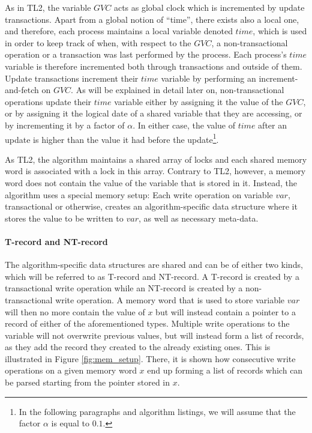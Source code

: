 \documentclass[11pt,letterpaper]{article}
\begin{document}
As in TL2,  the variable $\mathit{GVC}$
acts as  global  clock  which  is incremented  by update transactions.
 Apart from a global   notion of ``time'', there exists also
a local one, and therefore, each process maintains a local  
variable denoted $\mathit{time}$,  which is used in order to keep  
track of when, with
respect to the $\mathit{GVC}$, a non-transactional operation 
or a transaction was last performed by
the  process. Each  process's  $\mathit{time}$   variable is   
therefore incremented
both through transactions and outside  
of  them. Update  transactions  increment their  $\mathit{time}$ variable  by
performing an increment-and-fetch  
on  $\mathit{GVC}$.  As  will  be explained  in  detail  later  on,
non-transactional operations update  
their $\mathit{time}$ variable either by  assigning it the value of 
the $\mathit{GVC}$, or by assigning it the  
logical date of a shared variable that they are accessing, or by incrementing
it by a factor of $\alpha$.  
In either  case, the value of $\mathit{time}$ after an update  is higher than
the value  it had before  the update\footnote{In the   following paragraphs
and algorithm listings, we will assume that the factor $\alpha$ is equal   
to $0.1$.}.

As TL2, the  algorithm maintains a  shared array of locks  and each
shared memory word  
is associated with a lock in this array. Contrary to TL2, however, a memory
word does not contain  
the value of the variable that  is stored in it. Instead, the algorithm uses
a  special memory setup:  
Each   write  operation  on   variable  $\mathit{var}$,   transactional  or
otherwise, creates an algorithm-specific data  
structure where  it stores  the value to  be written to  $\mathit{var}$, as
well as necessary meta-data.


\paragraph{T-record  and NT-record}
The  algorithm-specific  data structures  are shared  and  can be  of 
either  two  kinds, which will be referred   to as T-record and NT-record. 
A T-record is created by a transactional write operation while an 
NT-record is created by a  non-transactional write operation. A memory word
that is used to store  
variable $\mathit{var}$ will then no more contain the value of $\mathit{x}$
but will instead contain a pointer to a  
record of either of the  aforementioned types. Multiple write operations to
the variable will not  
overwrite previous values, but will instead form a list of records, as they
add the record  they created to the already existing ones. 
This  is illustrated in Figure  \ref{fig:mem_setup}. There, it is shown how
consecutive write operations on a given memory  
word $\mathit{x}$ end up forming a list  of records
which can be parsed starting  from the pointer stored in $x$. 
\end{document}
